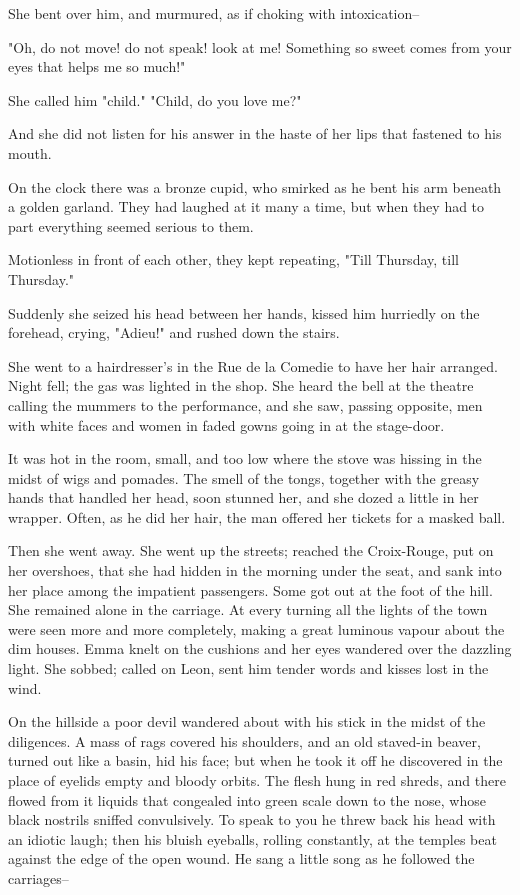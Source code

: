 \documentclass{tufte-book}
\begin{document}
She bent over him, and murmured, as if choking with intoxication--

"Oh, do not move! do not speak! look at me! Something so sweet comes
from your eyes that helps me so much!"

She called him "child." "Child, do you love me?"

And she did not listen for his answer in the haste of her lips that
fastened to his mouth.

On the clock there was a bronze cupid, who smirked as he bent his arm
beneath a golden garland. They had laughed at it many a time, but when
they had to part everything seemed serious to them.

Motionless in front of each other, they kept repeating, "Till Thursday,
till Thursday."

Suddenly she seized his head between her hands, kissed him hurriedly on
the forehead, crying, "Adieu!" and rushed down the stairs.

She went to a hairdresser's in the Rue de la Comedie to have her hair
arranged. Night fell; the gas was lighted in the shop. She heard the
bell at the theatre calling the mummers to the performance, and she saw,
passing opposite, men with white faces and women in faded gowns going in
at the stage-door.

It was hot in the room, small, and too low where the stove was hissing
in the midst of wigs and pomades. The smell of the tongs, together with
the greasy hands that handled her head, soon stunned her, and she dozed
a little in her wrapper. Often, as he did her hair, the man offered her
tickets for a masked ball.

Then she went away. She went up the streets; reached the Croix-Rouge,
put on her overshoes, that she had hidden in the morning under the seat,
and sank into her place among the impatient passengers. Some got out
at the foot of the hill. She remained alone in the carriage. At every
turning all the lights of the town were seen more and more completely,
making a great luminous vapour about the dim houses. Emma knelt on the
cushions and her eyes wandered over the dazzling light. She sobbed;
called on Leon, sent him tender words and kisses lost in the wind.

On the hillside a poor devil wandered about with his stick in the midst
of the diligences. A mass of rags covered his shoulders, and an old
staved-in beaver, turned out like a basin, hid his face; but when he
took it off he discovered in the place of eyelids empty and bloody
orbits. The flesh hung in red shreds, and there flowed from it liquids
that congealed into green scale down to the nose, whose black nostrils
sniffed convulsively. To speak to you he threw back his head with an
idiotic laugh; then his bluish eyeballs, rolling constantly, at the
temples beat against the edge of the open wound. He sang a little song
as he followed the carriages--
\end{document}
